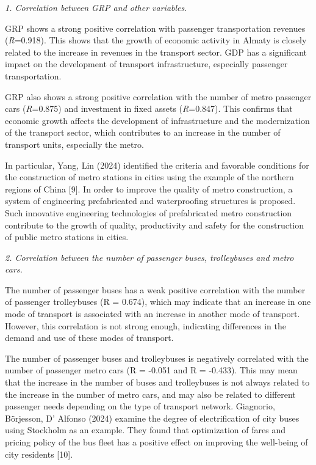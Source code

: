 \begin{multicols}{2}
\emph{1. Correlation between GRP and other variables}.

GRP shows a strong positive correlation with passenger transportation
revenues (\emph{R}=0.918). This shows that the growth of economic
activity in Almaty is closely related to the increase in revenues in the
transport sector. GDP has a significant impact on the development of
transport infrastructure, especially passenger transportation.

GRP also shows a strong positive correlation with the number of metro
passenger cars (\emph{R}=0.875) and investment in fixed assets
(\emph{R}=0.847). This confirms that economic growth affects the
development of infrastructure and the modernization of the transport
sector, which contributes to an increase in the number of transport
units, especially the metro.

In particular, Yang, Lin (2024) identified the criteria and favorable
conditions for the construction of metro stations in cities using the
example of the northern regions of China {[}9{]}. In order to improve
the quality of metro construction, a system of engineering prefabricated
and waterproofing structures is proposed. Such innovative engineering
technologies of prefabricated metro construction contribute to the
growth of quality, productivity and safety for the construction of
public metro stations in cities.

\emph{2. Correlation between the number of passenger buses, trolleybuses
and metro cars.}

The number of passenger buses has a weak positive correlation with the
number of passenger trolleybuses (R = 0.674), which may indicate that an
increase in one mode of transport is associated with an increase in
another mode of transport. However, this correlation is not strong
enough, indicating differences in the demand and use of these modes of
transport.

The number of passenger buses and trolleybuses is negatively correlated
with the number of passenger metro cars (R = -0.051 and R = -0.433).
This may mean that the increase in the number of buses and trolleybuses
is not always related to the increase in the number of metro cars, and
may also be related to different passenger needs depending on the type
of transport network. Giagnorio, Börjesson, D' Alfonso
(2024) examine the degree of electrification of city buses using
Stockholm as an example. They found that optimization of fares and
pricing policy of the bus fleet has a positive effect on improving the
well-being of city residents {[}10{]}.


\end{multicols}
